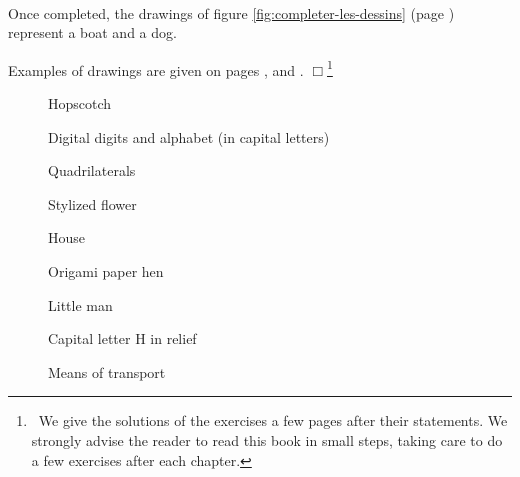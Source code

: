 \clearpage
\begin{corriges}{\ \\

\vspace{-\baselineskip}
\tiret Once completed, the drawings of figure
\ref{fig:completer-les-dessins} (page \pageref{fig:completer-les-dessins})
rep\-re\-sent a boat and a dog.

\tiret  Examples of drawings
are given on pages \pageref{fig:marelle}, \pageref{fig:quadrilateres} and
\pageref{fig:transports}.
$\Box$\footnote{\ We give the solutions of the exercises a few pages
after their state\-ments.
We strongly advise the reader to read this book in small steps,
taking care to do a few exercises after each chapter.}
}\end{corriges}
\begin{figure}[htbp]
 \caption{Hopscotch}
 \label{fig:marelle}
\end{figure}
\vfill
\begin{figure}[htbp]
 \caption{Digital digits and alphabet (in capital letters)}
 \label{fig:alphabet}
\end{figure}
\vfill
\twocolumn
\begin{figure}[h]
 \caption{Quadrilaterals}\label{fig:quadrilateres}
\end{figure}
\begin{figure}[h]
 \caption{Stylized flower}
\end{figure}
\vfill
\begin{figure}[h]
 \caption{House}
\end{figure}
\vfil
\begin{figure}[h]
 \caption{Origami paper hen}
\end{figure}
\vfil
\begin{figure}[h]
 \caption{Little man}
\end{figure}
\vfil
\begin{figure}[h]
 \caption{Capital letter H in relief}
 \label{fig:h-relief}
\end{figure}
\onecolumn
\begin{figure}[h]
 \caption{Means of transport}\label{fig:transports}
\end{figure}


